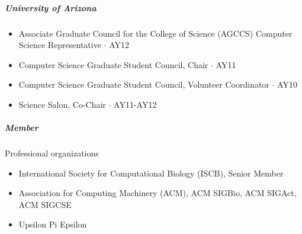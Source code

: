 \documentclass[10pt,letterpaper]{article}
\newcommand{\bigdot}{$\cdot$\xspace}
\begin{document}
\subparagraph{University of Arizona}
\begin{itemize}
	\item Associate Graduate Council for the College of Science (AGCCS) Computer Science Representative  \bigdot AY12
	\item Computer Science Graduate Student Council, Chair \bigdot AY11
	\item Computer Science Graduate Student Council, Volunteer Coordinator \bigdot AY10
	\item Science Salon, Co-Chair \bigdot AY11-AY12
\end{itemize}
%
%
%
%
%

\subparagraph{Member} Professional organizations
\begin{itemize}
\item International Society for Computational Biology (ISCB), Senior Member
\item Association for Computing Machinery (ACM), ACM SIGBio, ACM SIGAct, ACM SIGCSE
\item Upsilon Pi Epsilon
\end{itemize}
\end{document}
